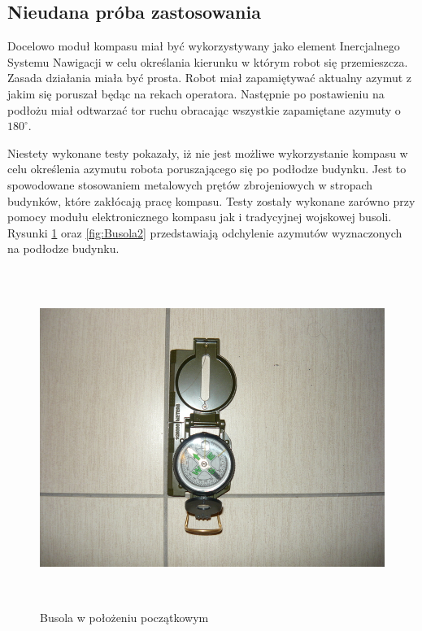 \subsection{Nieudana próba zastosowania}
Docelowo moduł kompasu miał być wykorzystywany jako element Inercjalnego Systemu
Nawigacji w celu określania kierunku w którym robot się przemieszcza. Zasada
działania miała być prosta. Robot miał zapamiętywać aktualny azymut z jakim się
poruszał będąc na rekach operatora. Następnie po postawieniu na podłożu miał
odtwarzać tor ruchu obracając wszystkie zapamiętane azymuty o $180^{\circ}$.

Niestety wykonane testy pokazały, iż
nie jest możliwe wykorzystanie kompasu w celu określenia azymutu robota poruszającego się po podłodze budynku. Jest to
spowodowane stosowaniem metalowych prętów zbrojeniowych w stropach budynków,
które zakłócają pracę kompasu. Testy zostały wykonane zarówno przy pomocy modułu
elektronicznego kompasu jak i tradycyjnej wojskowej busoli. Rysunki
\ref{fig:Busola1} oraz \ref{fig:Busola2} przedstawiają odchylenie azymutów
wyznaczonych na podłodze budynku.
\begin{figure}[!ht]
 \centering
 \includegraphics[height=110mm]{../images/ch04/compass01.jpg}
 \caption{Busola w położeniu początkowym}
 \label{fig:Busola1}
\end{figure}
\newpage
